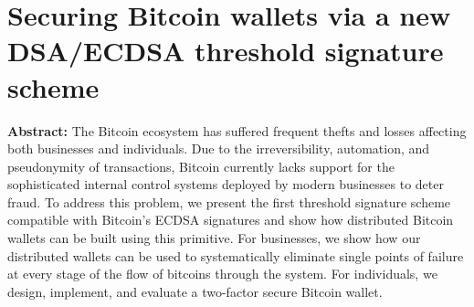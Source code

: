 \section{Securing Bitcoin wallets via a new DSA/ECDSA threshold signature scheme }

\textbf{Abstract:} 
The Bitcoin ecosystem has suffered frequent thefts and losses affecting both businesses and individuals. Due to the irreversibility, automation, and pseudonymity of transactions, Bitcoin currently lacks support for the sophisticated internal control systems deployed by modern businesses to deter fraud. To address this problem, we present the first threshold signature scheme compatible with Bitcoin’s ECDSA signatures and show how distributed Bitcoin wallets can be built using this primitive. For businesses, we show how our distributed wallets can be used to systematically eliminate single points of failure at every stage of the flow of bitcoins through the system. For individuals, we design, implement, and evaluate a two-factor secure Bitcoin wallet.
